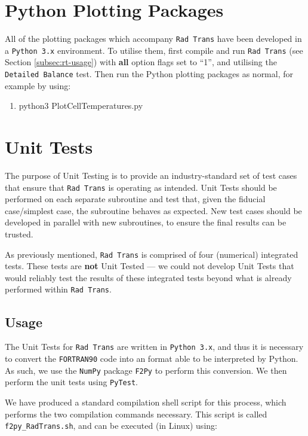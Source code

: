 \section{Python Plotting Packages}

All of the plotting packages which accompany \verb|Rad Trans| have been developed in a \verb|Python 3.x| environment. To utilise them, first compile and run \verb|Rad Trans| (see Section \ref{subsec:rt-usage}) with \textbf{all} option flags set to ``1'', and utilising the \verb|Detailed Balance| test. Then run the Python plotting packages as normal, for example by using:

\begin{enumerate}
    \item python3 PlotCellTemperatures.py
\end{enumerate}

\section{Unit Tests}
\label{sec:unit-tests}

The purpose of Unit Testing is to provide an industry-standard set of test cases that ensure that \verb|Rad Trans| is operating as intended. Unit Tests should be performed on each separate subroutine and test that, given the fiducial case/simplest case, the subroutine behaves as expected. New test cases should be developed in parallel with new subroutines, to ensure the final results can be trusted.

As previously mentioned, \verb|Rad Trans| is comprised of four (numerical) integrated tests. These tests are \textbf{not} Unit Tested --- we could not develop Unit Tests that would reliably test the results of these integrated tests beyond what is already performed within \verb|Rad Trans|.

\subsection{Usage}

The Unit Tests for \verb|Rad Trans| are written in \verb|Python 3.x|, and thus it is necessary to convert the \verb|FORTRAN90| code into an format able to be interpreted by Python. As such, we use the \verb|NumPy| package \verb|F2Py| to perform this conversion. We then perform the unit tests using \verb|PyTest|.

We have produced a standard compilation shell script for this process, which performs the two compilation commands necessary. This script is called \verb|f2py_RadTrans.sh|, and can be executed (in Linux) using:

